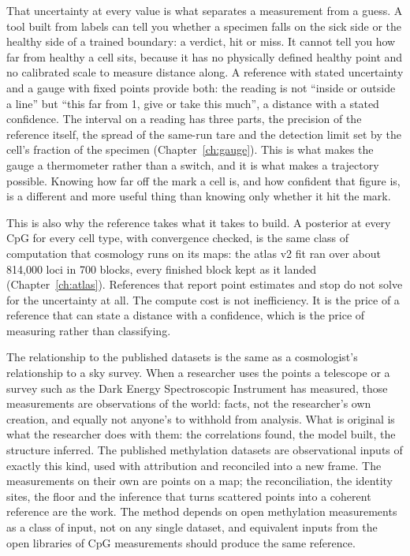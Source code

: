 That uncertainty at every value is what separates a measurement from a guess. A tool built from labels can tell you whether a specimen
falls on the sick side or the healthy side of a trained boundary: a verdict, hit or miss. It cannot tell you how far from healthy a cell
sits, because it has no physically defined healthy point and no calibrated scale to measure distance along. A reference with stated
uncertainty and a gauge with fixed points provide both: the reading is not ``inside or outside a line'' but ``this far from 1, give or take
this much'', a distance with a stated confidence. The interval on a reading has three parts, the precision of the reference itself, the
spread of the same-run tare and the detection limit set by the cell's fraction of the specimen (Chapter~\ref{ch:gauge}). This is what makes
the gauge a thermometer rather than a switch, and it is what makes a trajectory possible. Knowing how far off the mark a cell is, and how
confident that figure is, is a different and more useful thing than knowing only whether it hit the mark. \interp

This is also why the reference takes what it takes to build. A posterior at every CpG for every cell type, with convergence checked, is
the same class of computation that cosmology runs on its maps: the atlas v2 fit ran over about 814,000 loci in 700 blocks, every finished
block kept as it landed (Chapter~\ref{ch:atlas}). \observed{} References that report point estimates and stop do not solve for the
uncertainty at all. The compute cost is not inefficiency. It is the price of a reference that can state a distance with a confidence,
which is the price of measuring rather than classifying. \interp

The relationship to the published datasets is the same as a cosmologist's relationship to a sky survey. When a researcher uses the points
a telescope or a survey such as the Dark Energy Spectroscopic Instrument has measured, those measurements are observations of the world:
facts, not the researcher's own creation, and equally not anyone's to withhold from analysis. What is original is what the researcher does
with them: the correlations found, the model built, the structure inferred. The published methylation datasets are observational inputs of
exactly this kind, used with attribution and reconciled into a new frame. The measurements on their own are points on a map; the
reconciliation, the identity sites, the floor and the inference that turns scattered points into a coherent reference are the work. The
method depends on open methylation measurements as a class of input, not on any single dataset, and equivalent inputs from the open
libraries of CpG measurements should produce the same reference. \interp

